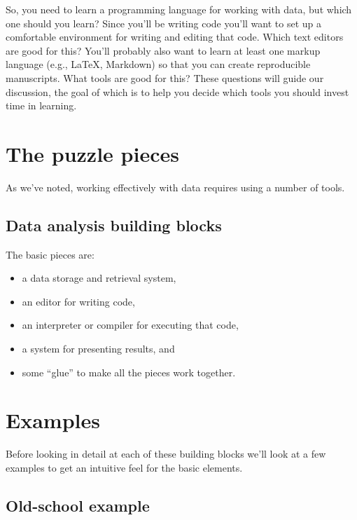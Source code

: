 \documentclass[
]{book}
\providecommand{\tightlist}{%
  \setlength{\itemsep}{0pt}\setlength{\parskip}{0pt}}
\begin{document}
So, you need to learn a programming language for working with data, but which one should you learn? Since you'll be writing code you'll want to set up a comfortable environment for writing and editing that code. Which text editors are good for this? You'll probably also want to learn at least one markup language (e.g., LaTeX, Markdown) so that you can create reproducible manuscripts. What tools are good for this? These questions will guide our discussion, the goal of which is to help you decide which tools you should invest time in learning.

\hypertarget{the-puzzle-pieces}{%
\section{The puzzle pieces}\label{the-puzzle-pieces}}

As we've noted, working effectively with data requires using a number of tools.

\hypertarget{data-analysis-building-blocks}{%
\subsection{Data analysis building blocks}\label{data-analysis-building-blocks}}

The basic pieces are:

\begin{itemize}
\tightlist
\item
  a data storage and retrieval system,
\item
  an editor for writing code,
\item
  an interpreter or compiler for executing that code,
\item
  a system for presenting results, and
\item
  some ``glue'' to make all the pieces work together.
\end{itemize}

\hypertarget{examples}{%
\section{Examples}\label{examples}}

Before looking in detail at each of these building blocks we'll look at a few examples to get an intuitive feel for the basic elements.

\hypertarget{old-school-example}{%
\subsection{Old-school example}\label{old-school-example}}
\end{document}
